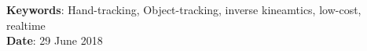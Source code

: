 \begin{titlepage}
\textbf{Keywords}: Hand-tracking, Object-tracking, inverse kineamtics, low-cost, realtime \\
\textbf{Date}: 29 June 2018\\

\end{titlepage}
